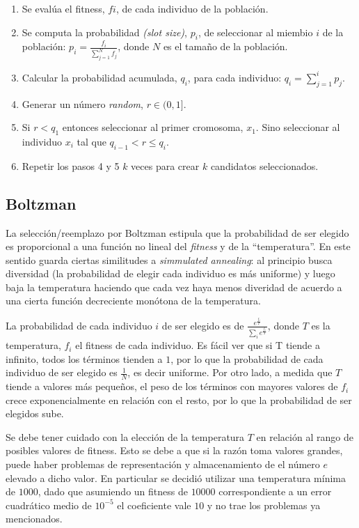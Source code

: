 \documentclass[%
    final,
    reprint,
    notitlepage,
    narroweqnarray,
    inline,
    twoside,
    invited
    ]{ieee}
\begin{document}
\begin{enumerate}

\item Se evalúa el fitness, $fi$, de cada individuo de la población.
\item Se computa la probabilidad \textit{(slot size)}, $p_i$, de seleccionar al miembio $i$ de la población:	$p_i=\frac{f_i}{\sum_{j=1}^{N}{f_j}}$, donde $N$ es el tamaño de la población.
\item Calcular la probabilidad acumulada, $q_i$, para cada individuo: $q_i=\sum_{j=1}^{i}{p_j}$.
\item Generar un número \textit{random}, $r \in (0, 1]$.
\item Si $r < q_1$ entonces seleccionar al primer cromosoma, $x_1$. Sino seleccionar al individuo $x_i$ tal que $q_{i-1} < r \leq q_i$. 
\item Repetir los pasos 4 y 5 $k$ veces para crear $k$ candidatos seleccionados.
\end{enumerate}

\subsection{Boltzman}

\par La selección/reemplazo por Boltzman estipula que la probabilidad 
de ser elegido es proporcional a una función no 
lineal del \textit{fitness} y de la ``temperatura''. 
En este sentido guarda ciertas similitudes a \textit{simmulated annealing}: al 
principio busca diversidad (la probabilidad de elegir cada individuo es más uniforme) 
y luego baja la temperatura haciendo que cada 
vez haya menos diveridad de acuerdo a una cierta función decreciente monótona de la temperatura. 
\par La probabilidad de cada individuo $i$ de ser elegido es de $ \frac{e^{\frac{f_i}{T}}}{\sum_{i}e^{\frac{f_i}{T}}}$, 
donde $T$ es la temperatura, $f_i$ el fitness de cada individuo. Es fácil ver que si T tiende a infinito, todos 
los términos tienden a $1$, por lo que la probabilidad de cada individuo de ser elegido es $\frac{1}{N}$, es decir 
uniforme. Por otro lado, a medida que $T$ tiende a valores más pequeños, el peso de los términos con mayores 
valores de $f_i$ crece exponencialmente en relación con el resto, por lo que la probabilidad de ser elegidos 
sube. 
\par Se debe tener cuidado con la elección de la temperatura $T$ en relación al rango de posibles valores de 
fitness. Esto se debe a que si la razón  toma valores grandes, puede haber problemas 
de representación y almacenamiento de el número $e$ elevado a dicho valor. En particular se decidió utilizar 
una temperatura mínima de $1000$, dado que asumiendo un fitness de $10000$ correspondiente a un error 
cuadrático medio de $10^{-5}$ el coeficiente vale $10$ y no trae los problemas ya mencionados.
\end{document}
